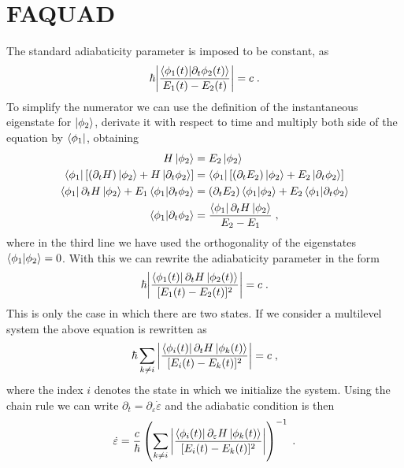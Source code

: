 \documentclass[a4paper,11pt]{article}
\begin{document}
\section{FAQUAD}
The standard adiabaticity parameter is imposed to be constant, as
\begin{equation}
	\hbar\abs{\frac{\braket{\phi_1(t)}{\partial_t\phi_2(t)}}{E_1(t)-E_2(t)}}=c\; .
	\label{eq:adiabatic_parameter}
\end{equation}
To simplify the numerator we can use the definition of the instantaneous eigenstate for $\ket{\phi_2}$, derivate it with respect to time and multiply both side of the equation by $\bra{\phi_1}$, obtaining
\begin{equation}
	\begin{split}
	H\ket{\phi_2}&=E_2\ket{\phi_2}\\
	\bra{\phi_1}[(\partial_t H)\ket{\phi_2}+H\ket{\partial_t\phi_2}]&=\bra{\phi_1}[(\partial_t E_2)\ket{\phi_2}+E_2\ket{\partial_t\phi_2}]\\
	\bra{\phi_1}\partial_t H\ket{\phi_2}+E_1\braket{\phi_1}{\partial_t\phi_2}&=(\partial_t E_2)\braket{\phi_1}{\phi_2}+E_2\braket{\phi_1}{\partial_t\phi_2}\\
	\braket{\phi_1}{\partial_t\phi_2}&=\frac{\bra{\phi_1}\partial_t H\ket{\phi_2}}{E_2-E_1}\; ,
	\end{split}
\end{equation}
where in the third line we have used the orthogonality of the eigenstates $\braket{\phi_1}{\phi_2}=0$. With this we can rewrite the adiabaticity parameter in the form
\begin{equation}
\hbar\abs{\frac{\bra{\phi_1(t)}\partial_t H\ket{\phi_2(t)}}{[E_1(t)-E_2(t)]^2}}=c\; .
\end{equation}
This is only the case in which there are two states. If we consider a multilevel system the above equation is rewritten as
\begin{equation}
	\hbar \sum _{k\neq i}\abs{\frac{\bra{\phi_i(t)}\partial_t H\ket{\phi_k(t)}}{[E_i(t)-E_k(t)]^2}}=c\; ,
\end{equation}
where the index $i$ denotes the state in which we initialize the system. Using the chain rule we can write $\partial_t=\partial_\varepsilon \dot{\varepsilon}$ and the adiabatic condition is then
\begin{equation}
	\dot{\varepsilon}=\frac{c}{\hbar}\left(\sum _{k\neq i}\abs{\frac{\bra{\phi_i(t)}\partial_\varepsilon H\ket{\phi_k(t)}}{[E_i(t)-E_k(t)]^2}}\right)^{-1}\; .
	\label{eq:detuning_EDO}
\end{equation}
\end{document}
